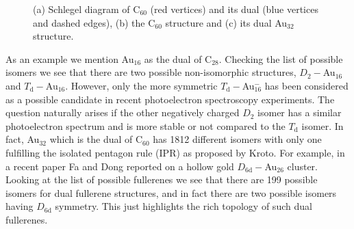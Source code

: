 \begin{figure}[htb]
\begin{center}
    \hspace{0.05\textwidth}
    \hspace{0.034\textwidth}
\caption{(a) Schlegel diagram of C$_{60}$ (red vertices) and its dual (blue vertices and dashed edges), (b) the C$_{60}$ structure and (c) its dual Au$_{32}$ structure.}
\label{fig:C60dual}
\end{center}
\end{figure}

As an example we mention Au$_{16}$ as the dual of C$_{28}$. Checking the list
of possible isomers\autocite{Brinkmann_HouseGraphsdatabase_2013} we see that
there are two possible non-isomorphic structures, $D_2-$Au$_{16}$ and
$T_\mathrm{d}-$Au$_{16}$. However, only the more symmetric $T_\mathrm{d}-$Au$_{16}^-$ has been
considered as a possible candidate in recent photoelectron spectroscopy
experiments.\autocite{Bulusu_Evidencehollowgolden_2006} The question naturally
arises if the other negatively charged $D_\mathrm{2}$ isomer has a similar photoelectron
spectrum and is more stable or not compared to the $T_\mathrm{d}$ isomer. In fact,
Au$_{32}$ which is the dual of C$_{60}$ has 1812 different isomers with only
one fulfilling the isolated pentagon rule (IPR) as proposed by
Kroto.\autocite{Kroto_stabilityfullerenesCn_1987} For example, in a recent
paper Fa and Dong reported on a hollow gold $D_\mathrm{6d}-$Au$_{26}$
cluster.\autocite{Fa-Dong-2006,Fa-Luong-2008} Looking at the list of possible
fullerenes we see that there are 199 possible isomers for dual fullerene
structures, and in fact there are two possible isomers having $D_\mathrm{6d}$
symmetry. This just highlights the rich topology of such dual fullerenes.

